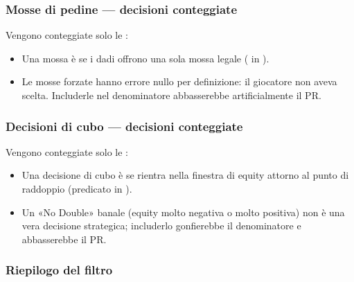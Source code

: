 \documentclass[letterpaper,10pt,italian]{sphinxmanual}
\begin{document}
\subsubsection{Mosse di pedine — decisioni conteggiate}
\label{\detokenize{stats_parity:coups-de-pions-decisions-comptees}}
\sphinxAtStartPar
Vengono conteggiate solo le :
\begin{itemize}
\item {} 
\sphinxAtStartPar
Una mossa è  se i dadi offrono una sola mossa legale ( in ).

\item {} 
\sphinxAtStartPar
Le mosse forzate hanno errore nullo per definizione: il giocatore non aveva scelta. Includerle nel denominatore abbasserebbe artificialmente il PR.

\end{itemize}


\subsubsection{Decisioni di cubo — decisioni conteggiate}
\label{\detokenize{stats_parity:decisions-de-cube-decisions-comptees}}
\sphinxAtStartPar
Vengono conteggiate solo le :
\begin{itemize}
\item {} 
\sphinxAtStartPar
Una decisione di cubo è  se rientra nella finestra di equity \sphinxcode{\sphinxupquote{{[}\sphinxhyphen{}0.16, +0.16{]}}} attorno al punto di raddoppio (predicato  in ).

\item {} 
\sphinxAtStartPar
Un «No Double» banale (equity molto negativa o molto positiva) non è una vera decisione strategica; includerlo gonfierebbe il denominatore e abbasserebbe il PR.

\end{itemize}


\subsubsection{Riepilogo del filtro}
\label{\detokenize{stats_parity:resume-du-filtre}}
\end{document}
